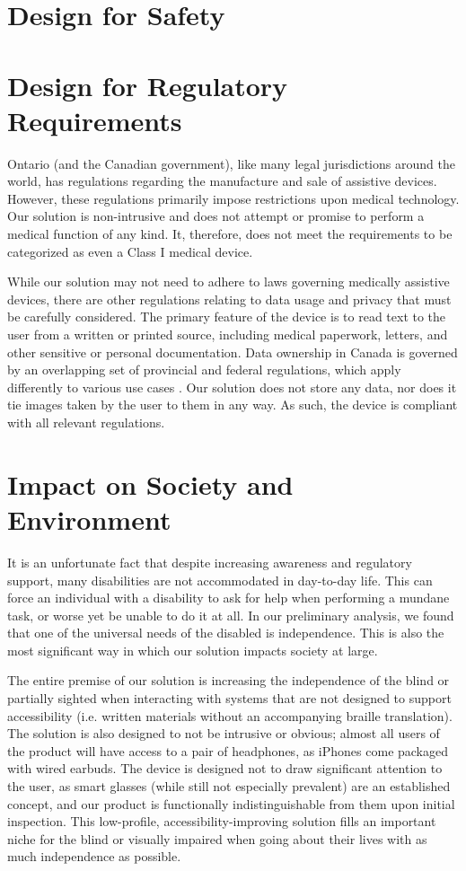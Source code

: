 \documentclass[a4paper,11pt]{article}
\begin{document}
\section{Design for Safety}

\section{Design for Regulatory Requirements}
Ontario (and the Canadian government), like many legal jurisdictions around the world, has regulations regarding the manufacture and sale of assistive devices. However, these regulations primarily impose restrictions upon medical technology. Our solution is non-intrusive and does not attempt or promise to perform a medical function of any kind. It, therefore, does not meet the requirements to be categorized as even a Class I medical device.

While our solution may not need to adhere to laws governing medically assistive devices, there are other regulations relating to data usage and privacy that must be carefully considered. The primary feature of the device is to read text to the user from a written or printed source, including medical paperwork, letters, and other sensitive or personal documentation. Data ownership in Canada is governed by an overlapping set of provincial and federal regulations, which apply differently to various use cases \cite{pipeda}. Our solution does not store any data, nor does it tie images taken by the user to them in any way. As such, the device is compliant with all relevant regulations.

\section{Impact on Society and Environment}
It is an unfortunate fact that despite increasing awareness and regulatory support, many disabilities are not accommodated in day-to-day life. This can force an individual with a disability to ask for help when performing a mundane task, or worse yet be unable to do it at all. In our preliminary analysis, we found that one of the universal needs of the disabled is independence. This is also the most significant way in which our solution impacts society at large.

The entire premise of our solution is increasing the independence of the blind or partially sighted when interacting with systems that are not designed to support accessibility (i.e. written materials without an accompanying braille translation). The solution is also designed to not be intrusive or obvious; almost all users of the product will have access to a pair of headphones, as iPhones come packaged with wired earbuds. The device is designed not to draw significant attention to the user, as smart glasses (while still not especially prevalent) are an established concept, and our product is functionally indistinguishable from them upon initial inspection. This low-profile, accessibility-improving solution fills an important niche for the blind or visually impaired when going about their lives with as much independence as possible.
\end{document}
